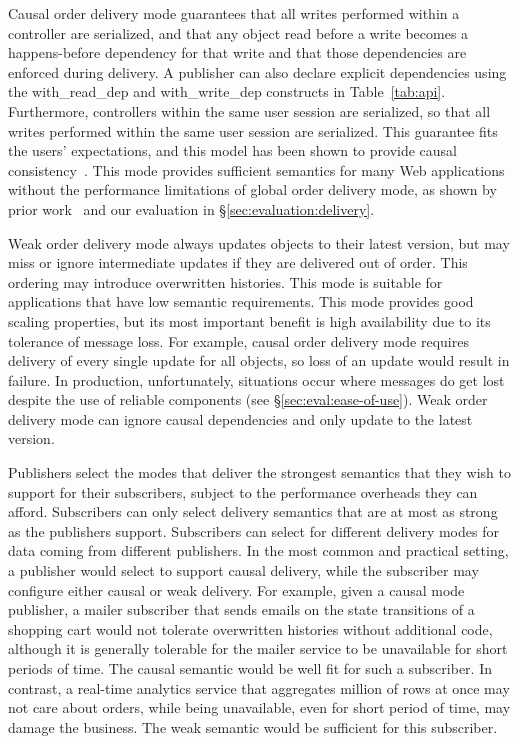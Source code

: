 Causal order delivery mode guarantees that all writes performed within
a controller are serialized, and that any object read before a write
becomes a happens-before dependency for that write and that those
dependencies are enforced during delivery.  A publisher can also
declare explicit dependencies using the {\code with\_read\_dep} and
{\code with\_write\_dep} constructs in Table~\ref{tab:api}.
Furthermore, controllers within the same user session are serialized,
so that all writes performed within the same user session are
serialized.  This guarantee fits the users' expectations, and this
model has been shown to provide causal
consistency~\cite{BSW2004,bolton}.
This mode provides sufficient semantics for many Web applications without the
performance limitations of global order delivery mode, as shown by prior
work~\cite{mahajan11cacTR,cops,eiger} and our evaluation in
\S\ref{sec:evaluation:delivery}.

Weak order delivery mode always updates objects to their latest
version, but may miss or ignore intermediate updates if they are
delivered out of order.  This ordering may introduce overwritten
histories.  This mode is suitable for applications that have low
semantic requirements.  This mode provides good scaling properties,
but its most important benefit is high availability due to its
tolerance of message loss.  For example, causal order delivery mode
requires delivery of every single update for all objects, so loss
of an update would result in failure.  In production, unfortunately,
situations occur where messages do get lost despite the use of
reliable components (see \S\ref{sec:eval:ease-of-use}).  Weak
order delivery mode can ignore causal dependencies and only update
to the latest version.

Publishers select the modes that deliver the strongest semantics that
they wish to support for their subscribers, subject to the performance
overheads they can afford.  Subscribers can only select delivery
semantics that are at most as strong as the publishers support.
Subscribers can select for different delivery modes for data coming
from different publishers.  In the most common and practical setting,
a publisher would select to support causal delivery, while the
subscriber may configure either causal or weak delivery. For example,
given a causal mode publisher, a mailer subscriber that sends emails
on the state transitions of a shopping cart would not tolerate
overwritten histories without additional code, although it is
generally tolerable for the mailer service to be unavailable for short
periods of time. The causal semantic would be well fit for
such a subscriber.  In contrast, a real-time analytics service that
aggregates million of rows at once may not care about orders, while
being unavailable, even for short period of time, may damage the
business.  The weak semantic would be sufficient for this subscriber.

